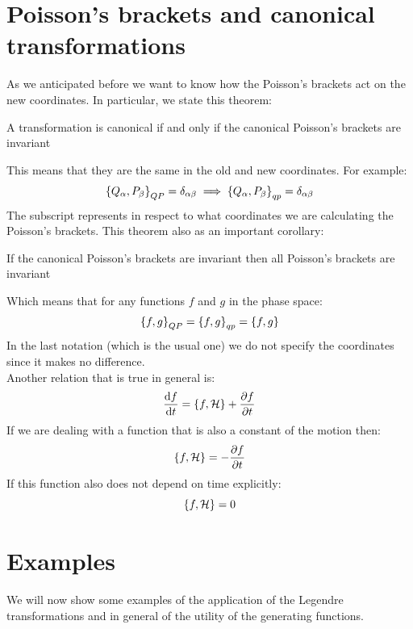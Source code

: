 \section{Poisson's brackets and canonical transformations}
As we anticipated before we want to know how the Poisson's brackets act on the new coordinates. In particular, we state this theorem:
\begin{theorem}
  A transformation is canonical if and only if the canonical Poisson's brackets are invariant
\end{theorem}
This means that they are the same in the old and new coordinates. For example:
\begin{equation}
    \pb{Q_{\alpha}}{P_{\beta}}_{QP} = \delta_{\alpha \beta} \implies \pb{Q_{\alpha}}{P_{\beta}}_{qp} = \delta_{\alpha \beta}
\end{equation}
The subscript represents in respect to what coordinates we are calculating the Poisson's brackets. This theorem also as an important corollary:
\begin{corollary}
    If the canonical Poisson's brackets are invariant then all Poisson's brackets are invariant
\end{corollary}
Which means that for any functions $f$ and $g$ in the phase space:
\begin{equation}
    \pb{f}{g}_{QP} = \pb{f}{g}_{qp} = \pb{f}{g}
\end{equation}
In the last notation (which is the usual one) we do not specify the coordinates since it makes no difference.\\
Another relation that is true in general is:
\begin{equation}
    \dv{f}{t} = \pb{f}{\hamfun} + \pdv{f}{t}
\end{equation}
If we are dealing with a function that is also a constant of the motion then:
\begin{equation}
    \pb{f}{\hamfun} = - \pdv{f}{t}
\end{equation}
If this function also does not depend on time explicitly:
\begin{equation}
    \pb{f}{\hamfun} = 0
\end{equation}
\section{Examples}
We will now show some examples of the application of the Legendre transformations and in general of the utility of the generating functions.
